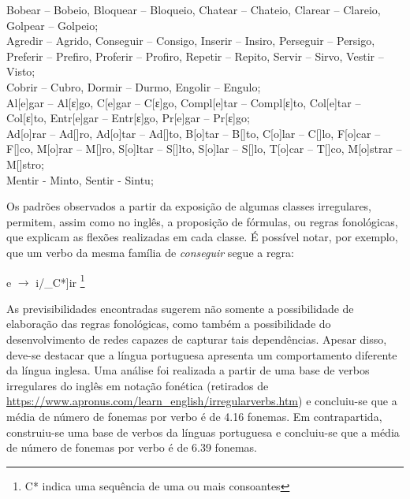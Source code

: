 \begin{center}

Bobear – Bobeio, Bloquear – Bloqueio, Chatear – Chateio, Clarear – Clareio, Golpear – Golpeio;\\

Agredir – Agrido, Conseguir – Consigo, Inserir – Insiro, Perseguir – Persigo, Preferir – Prefiro, Proferir – Profiro, Repetir – Repito, Servir –  Sirvo, Vestir – Visto;\\

Cobrir – Cubro, Dormir – Durmo, Engolir – Engulo;\\

 Al[e]gar – Al[ε]go, C[e]gar – C[ε]go, Compl[e]tar – Compl[ε]to,  Col[e]tar – Col[ε]to, Entr[e]gar – Entr[ε]go, Pr[e]gar – Pr[ε]go;\\

Ad[o]rar – Ad[\textopeno]ro, Ad[o]tar – Ad[\textopeno]to, B[o]tar – B[\textopeno]to, C[o]lar – C[\textopeno]lo, F[o]car – F[\textopeno]co, M[o]rar – M[\textopeno]ro, S[o]ltar – S[\textopeno]lto, S[o]lar – S[\textopeno]lo, T[o]car – T[\textopeno]co, M[o]strar – M[\textopeno]stro;\\

Mentir - Minto, Sentir - Sintu;

\end{center}

Os padrões observados a partir da exposição de algumas classes irregulares, permitem, assim como no inglês, a proposição de fórmulas, ou regras fonológicas, que explicam as flexões realizadas em cada classe. É possível notar, por exemplo, que um verbo da mesma família de \textit{conseguir} segue a regra:

\begin{center}
e $\rightarrow$ i/\_C*]ir \footnote{C* indica uma sequência de uma ou mais consoantes}
\end{center}


As previsibilidades encontradas sugerem não somente a possibilidade de elaboração das regras fonológicas, como também a possibilidade do desenvolvimento de redes capazes de capturar tais dependências. Apesar disso, deve-se destacar que a língua portuguesa apresenta um comportamento diferente da língua inglesa. Uma análise foi realizada a partir de uma base de verbos irregulares do inglês em notação fonética (retirados de \url{https://www.apronus.com/learn_english/irregularverbs.htm}) e concluiu-se que a média de número de fonemas por verbo é de 4.16 fonemas. Em contrapartida, construiu-se uma base de verbos da línguas portuguesa e concluiu-se que a média de número de fonemas por verbo é de 6.39 fonemas.

